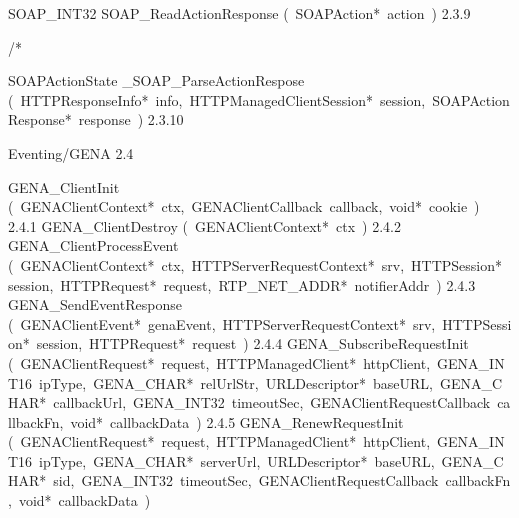 \documentclass{article}
\begin{document}
\begin{cxxentry}
\begin{cxxentry}
\begin{cxxfunction}
\begin{cxxdoc}
\end{cxxdoc}
\end{cxxfunction}
\begin{cxxfunction}
{SOAP\_INT32}
        {SOAP\_ReadActionResponse}
        {(\ SOAPAction*\ action\ )}
        {}
        {2.3.9}
\begin{cxxdoc}
/*

\end{cxxdoc}
\end{cxxfunction}
\begin{cxxfunction}
{SOAPActionState}
        {\_SOAP\_ParseActionRespose}
        {(\ HTTPResponseInfo*\ info,\ HTTPManagedClientSession*\ session,\ SOAPActionResponse*\ response\ )}
        {}
        {2.3.10}
\end{cxxfunction}
\end{cxxentry}
\begin{cxxentry}
{}
        {Eventing/GENA}
        {}
        {}
        {2.4}
\begin{cxxnames}
        {GENA\_ClientInit}
        {(\ GENAClientContext*\ ctx,\ GENAClientCallback\ callback,\ void*\ cookie\ )}
        {}
        {2.4.1}
        {GENA\_ClientDestroy}
        {(\ GENAClientContext*\ ctx\ )}
        {}
        {2.4.2}
        {GENA\_ClientProcessEvent}
        {(\ GENAClientContext*\ ctx,\ HTTPServerRequestContext*\ srv,\ HTTPSession*\ session,\ HTTPRequest*\ request,\ RTP\_NET\_ADDR*\ notifierAddr\ )}
        {}
        {2.4.3}
        {GENA\_SendEventResponse}
        {(\ GENAClientEvent*\ genaEvent,\ HTTPServerRequestContext*\ srv,\ HTTPSession*\ session,\ HTTPRequest*\ request\ )}
        {}
        {2.4.4}
        {GENA\_SubscribeRequestInit}
        {(\ GENAClientRequest*\ request,\ HTTPManagedClient*\ httpClient,\ GENA\_INT16\ ipType,\ GENA\_CHAR*\ relUrlStr,\ URLDescriptor*\ baseURL,\ GENA\_CHAR*\ callbackUrl,\ GENA\_INT32\ timeoutSec,\ GENAClientRequestCallback\ callbackFn,\ void*\ callbackData\ )}
        {}
        {2.4.5}
        {GENA\_RenewRequestInit}
        {(\ GENAClientRequest*\ request,\ HTTPManagedClient*\ httpClient,\ GENA\_INT16\ ipType,\ GENA\_CHAR*\ serverUrl,\ URLDescriptor*\ baseURL,\ GENA\_CHAR*\ sid,\ GENA\_INT32\ timeoutSec,\ GENAClientRequestCallback\ callbackFn,\ void*\ callbackData\ )}

\end{cxxnames}
\end{cxxentry}
\end{cxxentry}
\end{document}
